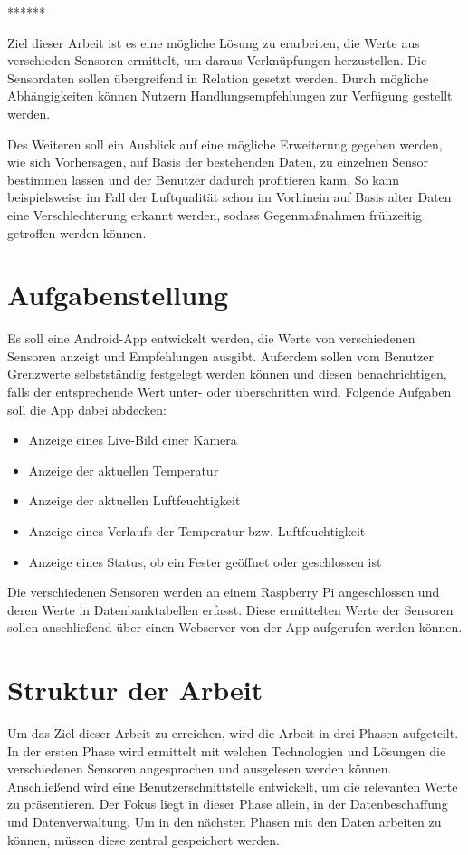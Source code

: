 ******

Ziel dieser Arbeit ist es eine mögliche Lösung zu erarbeiten, die Werte aus verschieden Sensoren ermittelt, um daraus Verknüpfungen herzustellen. Die Sensordaten sollen übergreifend in Relation gesetzt werden. Durch mögliche Abhängigkeiten können Nutzern Handlungsempfehlungen zur Verfügung gestellt werden.

Des Weiteren soll ein Ausblick auf eine mögliche Erweiterung gegeben werden, wie sich Vorhersagen, auf Basis der bestehenden Daten, zu einzelnen Sensor bestimmen lassen und der Benutzer dadurch profitieren kann. So kann beispielsweise im Fall der Luftqualität schon im Vorhinein auf Basis alter Daten eine Verschlechterung erkannt werden, sodass Gegenmaßnahmen frühzeitig getroffen werden können.


\section{Aufgabenstellung}
Es soll eine Android-App entwickelt werden, die Werte von verschiedenen Sensoren anzeigt und Empfehlungen ausgibt. Außerdem sollen vom Benutzer Grenzwerte selbstständig festgelegt werden können und diesen benachrichtigen, falls der entsprechende Wert unter- oder überschritten wird. 
Folgende Aufgaben soll die App dabei abdecken:
\begin{itemize}
	\item Anzeige eines Live-Bild einer Kamera
	\item Anzeige der aktuellen Temperatur
	\item Anzeige der aktuellen Luftfeuchtigkeit
	\item Anzeige eines Verlaufs der Temperatur bzw. Luftfeuchtigkeit
	\item Anzeige eines Status, ob ein Fester geöffnet oder geschlossen ist
\end{itemize} 
Die verschiedenen Sensoren werden an einem Raspberry Pi angeschlossen und deren Werte in Datenbanktabellen erfasst. Diese ermittelten Werte der Sensoren sollen anschließend über einen Webserver von der App aufgerufen werden können.


\section{Struktur der Arbeit}
Um das Ziel dieser Arbeit zu erreichen, wird die Arbeit in drei Phasen aufgeteilt. In der ersten Phase wird ermittelt mit welchen Technologien und Lösungen die verschiedenen Sensoren angesprochen und ausgelesen werden können. Anschließend wird eine Benutzerschnittstelle entwickelt, um die relevanten Werte zu präsentieren. Der Fokus liegt in dieser Phase allein, in der Datenbeschaffung und Datenverwaltung. Um in den nächsten Phasen mit den Daten arbeiten zu können, müssen diese zentral gespeichert werden.

